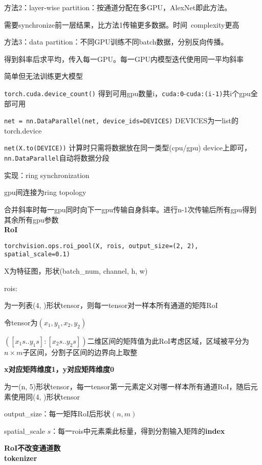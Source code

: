 \documentclass[UTF8]{ctexart}
\begin{document}
  方法2：layer-wise partition：按通道分配在多GPU，AlexNet即此方法。
  
  \quad 需要synchronize前一层结果，比方法1传输更多数据。时间\ complexity更高

  方法3：data partition：不同GPU训练不同batch数据，分别反向传播。

  \quad 得到斜率后求平均，传入每一GPU。每一GPU内模型迭代使用同一平均斜率
  
  \quad 简单但无法训练更大模型

  \quad \texttt{torch.cuda.device\_count()} 得到可用gpu数量i，\texttt{cuda:0}-\texttt{cuda:(i-1)}共i个gpu全部可用

  \quad \texttt{net = nn.DataParallel(net, device\_ids=DEVICES)} DEVICES为一list的torch.device

  \quad \texttt{net(X.to(DEVICE))} 计算时只需将数据放在同一类型(cpu/gpu) device上即可，\texttt{nn.DataParallel}自动将数据分段

  \quad 实现：ring synchronization 

  \quad \quad gpu间连接为ring topology
  
  \quad \quad 合并斜率时每一gpu同时向下一gpu传输自身斜率。进行n-1次传输后所有gpu得到其余所有gpu参数\\
\textbf{RoI}

  \texttt{torchvision.ops.roi\_pool(X, rois, output\_size=(2, 2), spatial\_scale=0.1)}

  \quad X为特征图，形状(batch\_num, channel, h, w)

  \quad rois:

  \quad \quad 为一列表(4, )形状tensor，则每一tensor对一样本所有通道的矩阵RoI

  \quad \quad \quad 令tensor为$(x_1, y_1, x_2, y_2)$

  \quad \quad \quad $([x_1 s .. y_1 s]: [x_2 s .. y_2 s])$二维区间的矩阵值为此RoI考虑区域，区域被平分为$n \times m$子区间，分割子区间的边界向上取整

  \quad \quad \quad \textbf{x对应矩阵维度1，y对应矩阵维度0}

  \quad \quad 为一(n, 5)形状tensor，每一tensor第一元素定义对哪一样本所有通道RoI，随后元素使用同(4, )形状tensor

  \quad output\_size：每一矩阵RoI后形状$(n, m)$

  \quad spatial\_scale $s$：每一rois中元素乘此标量，得到分割输入矩阵的\textbf{index}

  \textbf{RoI不改变通道数}\\
\textbf{tokenizer}
\end{document}

